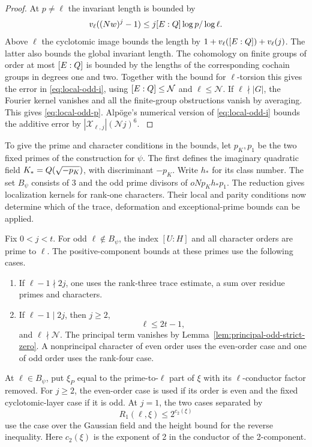 \begin{proof}

At \(p\ne\ell\) the invariant length is bounded by
\[
     v_\ell((Nw)^j-1)\le j[E:Q]\log p/\log\ell.
\]
Above \(\ell\) the cyclotomic image bounds the length by
\(1+v_\ell([E:Q])+v_\ell(j)\). The latter also bounds the global
invariant length. The cohomology on finite groups of
order at most \([E:Q]\) is bounded by the lengths of the
corresponding cochain groups in degrees one and two.
Together with the bound for \(\ell\)-torsion this gives
the error in \eqref{eq:local-odd-i}, using \([E:Q]\le\mathcal N\) and
\(\ell\le\mathcal N\). If \(\ell\nmid |G|\), the
Fourier kernel vanishes and all the finite-group
obstructions vanish by averaging. This gives \eqref{eq:local-odd-p}.
Alp\"oge's numerical version of \eqref{eq:local-odd-i} bounds the additive error by
\(|\mathcal X_{\ell,j}|(\mathcal Nj)^6\). \label{cor:ordinary-odd-primes-1}

\end{proof}

To give the prime and character conditions in the bounds, let
\(p_K,p_1\) be the two fixed primes of the construction for
\(\psi\). The first defines the imaginary quadratic field
\(K_*=Q(\sqrt{-p_K})\), with discriminant \(-p_K\).
Write \(h_*\) for its class number. The set \(B_\psi\) consists
of \(3\) and the odd prime divisors of \(oNp_Kh_*p_1\).
The reduction gives localization kernels for rank-one characters. Their local and parity conditions now determine which of the trace, deformation and exceptional-prime bounds can be applied.

\begin{lemma}
\label{lem:odd-prime-positive-ranges}
Fix \(0<j<t\). For odd \(\ell\notin B_\psi\), the index
\([U:H]\) and all character orders are prime to \(\ell\).
The positive-component bounds at these primes use the following cases.
\begin{enumerate}
\item If \(\ell-1\nmid2j\), one uses the rank-three trace estimate, a sum over residue
      primes and characters.
\item If \(\ell-1\mid2j\), then \(j\ge2\),
\[
 \ell\le2t-1,
\]
and
      \(\ell\nmid\mathcal N\). The principal term vanishes by Lemma~\ref{lem:principal-odd-strict-zero}. A nonprincipal character of even order
      uses the even-order case and one of odd order uses the rank-four case.
\end{enumerate}
At \(\ell\in B_\psi\), put \(\xi_P\) equal to the prime-to-\(\ell\)
part of \(\xi\) with its \(\ell\)-conductor factor removed.
For \(j\ge2\), the even-order case is used if its order is even and the fixed cyclotomic-layer case
if it is odd. At \(j=1\), the two cases separated by
\[
 R_1(\ell,\xi)\le 2^{c_2(\xi)}
\]
use the case over the Gaussian field and the height
bound for the reverse inequality. Here \(c_2(\xi)\) is the
exponent of 2 in the conductor of the 2-component.
\end{lemma}

